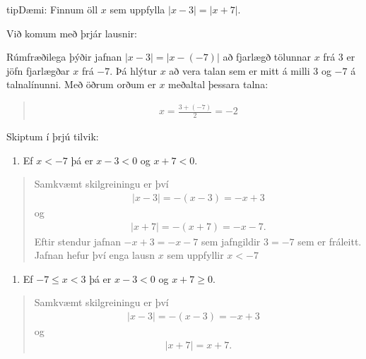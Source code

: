\documentclass[a4paper,10pt,icelandic]{sphinxmanual}
\begin{document}
\begin{sphinxadmonition}{tip}{Dæmi:}
Finnum öll \(x\) sem uppfylla \(|x-3|=|x+7|\).

Við komum með þrjár lausnir:

 Rúmfræðilega þýðir jafnan \(|x-3|=|x-(-7)|\) að fjarlægð tölunnar \(x\) frá \(3\) er jöfn fjarlægðar \(x\) frá \(-7\). Þá hlýtur \(x\) að vera talan sem er mitt á milli \(3\) og \(-7\) á talnalínunni. Með öðrum orðum er \(x\) meðaltal þessara talna:
\begin{quote}
\begin{equation*}
\begin{split}x=\frac{3+(-7)}{2}=-2\end{split}
\end{equation*}\end{quote}

 Skiptum í þrjú tilvik:
\begin{enumerate}
%
\item {} 
Ef \(x<-7\) þá er \(x-3<0\) og \(x+7<0\).

\end{enumerate}
\begin{quote}

Samkvæmt skilgreiningu er því
\begin{equation*}
\begin{split}|x-3|=-(x-3)=-x+3\end{split}
\end{equation*}
og
\begin{equation*}
\begin{split}|x+7|=-(x+7)=-x-7.\end{split}
\end{equation*}
Eftir stendur jafnan \(-x+3=-x-7\) sem jafngildir \(3=-7\) sem er fráleitt.
Jafnan hefur því enga lausn \(x\) sem uppfyllir \(x<-7\)
\end{quote}
\begin{enumerate}
%
\setcounter{enumi}{1}
\item {} 
Ef \(-7\leq x<3\) þá er \(x-3<0\) og \(x+7\geq 0\).

\end{enumerate}
\begin{quote}

Samkvæmt skilgreiningu er því
\begin{equation*}
\begin{split}|x-3|=-(x-3)=-x+3 \quad\end{split}
\end{equation*}
og
\begin{equation*}
\begin{split}|x+7|=x+7.\end{split}
\end{equation*}\end{quote}


\end{sphinxadmonition}
\end{document}
